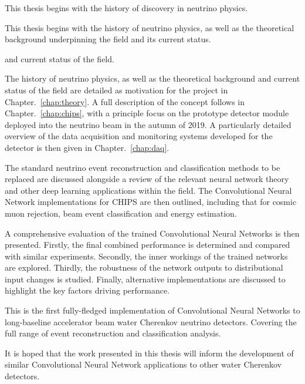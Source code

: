 This thesis begins with the history of discovery in neutrino physics.

This thesis begins with the history of neutrino physics, as well as the theoretical background
underpinning the field and its current status. 


and
current status of the field.


The history of neutrino physics, as well as the theoretical background and current status of the
field are detailed as motivation for the \chips project in Chapter.~\ref{chap:theory}. A
full description of the \chips concept follows in Chapter.~\ref{chap:chips}, with a principle
focus on the \chipsfive prototype detector module deployed into the \numi neutrino beam in the
autumn of 2019. A particularly detailed overview of the data acquisition and monitoring systems
developed for the \chipsfive detector is then given in Chapter.~\ref{chap:daq}.

The standard neutrino event reconstruction and classification methods to be replaced are discussed
alongside a review of the relevant neural network theory and other deep learning applications
within the field. The Convolutional Neural Network implementations for CHIPS are then outlined,
including that for cosmic muon rejection, beam event classification and energy estimation.

A comprehensive evaluation of the trained Convolutional Neural Networks is then presented.
Firstly, the final combined performance is determined and compared with similar experiments.
Secondly, the inner workings of the trained networks are explored. Thirdly, the robustness of the
network outputs to distributional input changes is studied. Finally, alternative implementations
are discussed to highlight the key factors driving performance.

This is the first fully-fledged implementation of Convolutional Neural Networks to long-baseline
accelerator beam water Cherenkov neutrino detectors. Covering the full range of event
reconstruction and classification analysis. 

It is hoped that the work presented in this thesis will inform the development of similar
Convolutional Neural Network applications to other water Cherenkov detectors.

